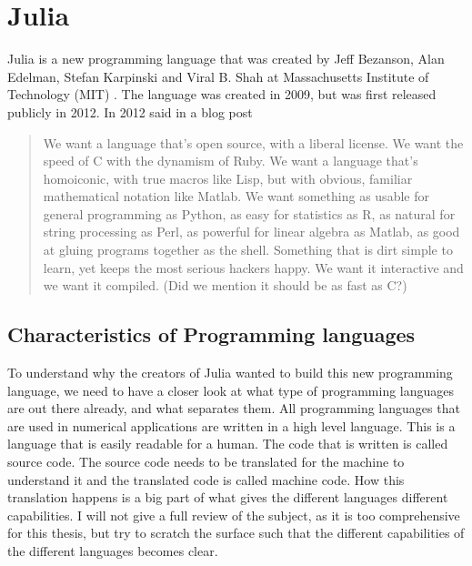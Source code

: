 \chapter{Julia}
\label{ch:Julia}
Julia is a new programming language that was created by Jeff Bezanson, Alan Edelman, Stefan Karpinski and Viral B. Shah at Massachusetts Institute of Technology (MIT) \emph{\citep{juliaLab}}. The language was created in 2009, but was first released publicly in 2012. In 2012 \citet{juliaBlogRelease2012} said in a blog post
\blockquote{We want a language that’s open source, with a liberal license. We want the speed of C with the dynamism of Ruby. We want a language that’s homoiconic, with true macros like Lisp, but with obvious, familiar mathematical notation like Matlab. We want something as usable for general programming as Python, as easy for statistics as R, as natural for string processing as Perl, as powerful for linear algebra as Matlab, as good at gluing programs together as the shell. Something that is dirt simple to learn, yet keeps the most serious hackers happy. We want it interactive and we want it compiled. (Did we mention it should be as fast as C?)}

\section{Characteristics of Programming languages}
To understand why the creators of Julia wanted to build this new programming language, we need to have a closer look at what type of programming languages are out there already, and what separates them. All programming languages that are used in numerical applications are written in a high level language. This is a language that is easily readable for a human. The code that is written is called source code. The source code needs to be translated for the machine to understand it and the translated code is called machine code. How this translation happens is a big part of what gives the different languages different capabilities. I will not give a full review of the subject, as it is too comprehensive for this thesis, but try to scratch the surface such that the different capabilities of the different languages becomes clear.

